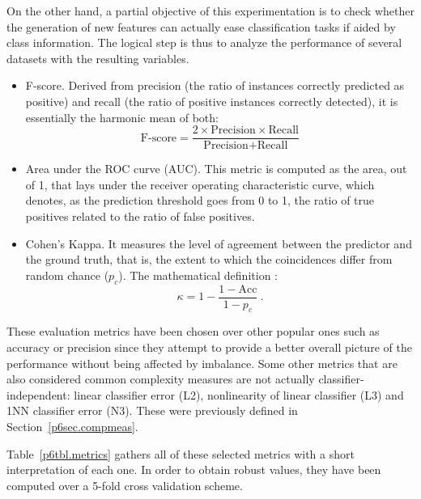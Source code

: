 On the other hand, a partial objective of this experimentation is to check whether the generation of new features can actually ease classification tasks if aided by class information. The logical step is thus to analyze the performance of several datasets with the resulting variables.
\begin{itemize}
  \item F-score. Derived from precision (the ratio of instances correctly predicted as positive) and recall (the ratio of positive instances correctly detected), it is essentially the harmonic mean of both: \begin{equation}\text{F-score}=\frac{2\times\text{Precision}\times\text{Recall}}{\text{Precision}+\text{Recall}}\end{equation}
  \item Area under the ROC curve (AUC). This metric is computed as the area, out of 1, that lays under the receiver operating characteristic curve, which denotes, as the prediction threshold goes from 0 to 1, the ratio of true positives related to the ratio of false positives.
  \item Cohen's Kappa. It measures the level of agreement between the predictor and the ground truth, that is, the extent to which the coincidences differ from random chance ($p_c$). The mathematical definition : \begin{equation}\kappa=1-\frac{1-\text{Acc}}{1-p_c}~.\end{equation}
\end{itemize}
These evaluation metrics have been chosen over other popular ones such as accuracy or precision since they attempt to provide a better overall picture of the performance without being affected by imbalance.
Some other metrics that are also considered common complexity measures are not actually classifier-independent: linear classifier error (L2), nonlinearity of linear classifier (L3) and 1NN classifier error (N3). These were previously defined in Section~\ref{p6sec.compmeas}.

Table~\ref{p6tbl.metrics} gathers all of these selected metrics with a short interpretation of each one. In order to obtain robust values, they have been computed over a 5-fold cross validation scheme.

